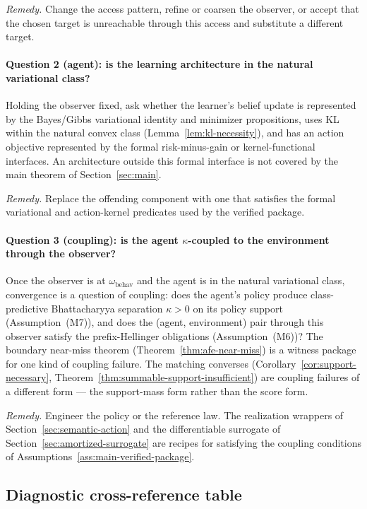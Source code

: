 \documentclass[11pt]{article}
\theoremstyle{definition}
\theoremstyle{remark}
\theoremstyle{plain}
\theoremstyle{definition}
\begin{document}
\emph{Remedy.} Change the access pattern, refine or coarsen the observer, or accept that the chosen target is unreachable through this access and substitute a different target.

\paragraph{Question 2 (agent): is the learning architecture in the natural variational class?}
Holding the observer fixed, ask whether the learner's belief update is represented by the Bayes/Gibbs variational identity and minimizer propositions, uses KL within the natural convex class (Lemma~\ref{lem:kl-necessity}), and has an action objective represented by the formal risk-minus-gain or kernel-functional interfaces. An architecture outside this formal interface is not covered by the main theorem of Section~\ref{sec:main}.

\emph{Remedy.} Replace the offending component with one that satisfies the formal variational and action-kernel predicates used by the verified package.

\paragraph{Question 3 (coupling): is the agent $\kappa$-coupled to the environment through the observer?}
Once the observer is at $\omega_{\mathrm{behav}}$ and the agent is in the natural variational class, convergence is a question of coupling: does the agent's policy produce class-predictive Bhattacharyya separation $\kappa>0$ on its policy support (Assumption~\textup{(M7)}), and does the (agent, environment) pair through this observer satisfy the prefix-Hellinger obligations (Assumption~\textup{(M6)})? The boundary near-miss theorem (Theorem~\ref{thm:afe-near-miss}) is a witness package for one kind of coupling failure. The matching converses (Corollary~\ref{cor:support-necessary}, Theorem~\ref{thm:summable-support-insufficient}) are coupling failures of a different form --- the support-mass form rather than the score form.

\emph{Remedy.} Engineer the policy or the reference law. The realization wrappers of Section~\ref{sec:semantic-action} and the differentiable surrogate of Section~\ref{sec:amortized-surrogate} are recipes for satisfying the coupling conditions of Assumptions~\ref{ass:main-verified-package}.

\subsection{Diagnostic cross-reference table}
\label{app:diagnostic-table}
\end{document}
